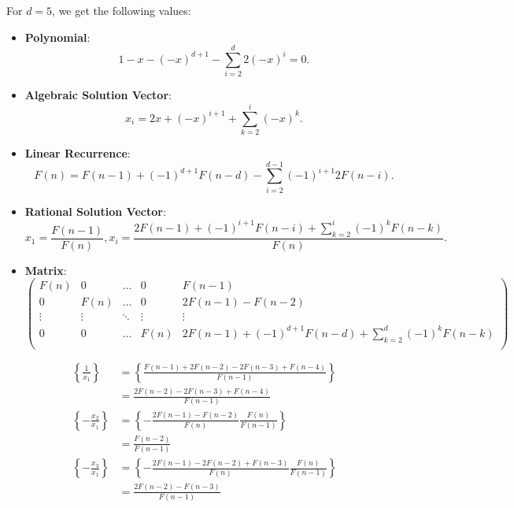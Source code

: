 \documentclass[english,version-2020-11]{uzl-thesis}
\begin{document}
\begin{example}
  For $d = 5$, we get the following values:

\end{example}

\begin{itemize}
  \item \textbf{Polynomial}:
    \[
      1 - x - (-x)^{d+1} - \sum_{i = 2}^{d} 2 (-x)^{i} = 0.
    \]
  \item \textbf{Algebraic Solution Vector}:
    \[
      x_i = 2x + (-x)^{i+1} + \sum_{k=2}^{i} (-x)^{k}.
    \]
  \item \textbf{Linear Recurrence}:
    \[
      F(n) = F(n - 1) + (-1)^{d+1} F(n - d) - \sum_{i=2}^{d - 1} (-1)^{i+1} 2 F(n - i).
    \]
  \item \textbf{Rational Solution Vector}:
    \[
      x_1 = \frac{F(n - 1)}{F(n)}, x_i = \frac{2 F(n-1) + (-1)^{i+1} F(n - i) + \sum_{k=2}^i (-1)^k F(n-k)}{F(n)}.
    \]
  \item \textbf{Matrix}:
    \[\left(\begin{array}{cccc|c}
      F(n)   & 0      & \dots  & 0      & F(n - 1) \\
        0    & F(n)   & \dots  & 0      & 2 F(n - 1) - F(n - 2) \\
      \vdots & \vdots & \ddots & \vdots & \vdots   \\
        0    & 0      & \dots  & F(n)   & 2 F(n-1) + (-1)^{d+1} F(n - d) + \sum_{k=2}^d (-1)^k F(n-k) \\
    \end{array}\right)\]
\end{itemize}

\begin{example}
  \begin{align*}
    \left\{ \frac{1}{x_1} \right\}
    & = \left\{ \frac{F(n - 1) + 2 F(n - 2) - 2 F(n - 3) + F(n - 4)}{F(n - 1)} \right\} \\
    & = \frac{2 F(n - 2) - 2 F(n - 3) + F(n - 4)}{F(n - 1)} \\
    \left\{ -\frac{x_2}{x_1} \right\}
    & = \left\{ -\frac{2 F(n - 1) - F(n - 2)}{F(n)} \frac{F(n)}{F(n - 1)} \right\} \\
    & = \frac{F(n - 2)}{F(n - 1)} \\
    \left\{ -\frac{x_3}{x_1} \right\}
    & = \left\{ -\frac{2 F(n - 1) - 2 F(n - 2) + F(n - 3)}{F(n)} \frac{F(n)}{F(n - 1)} \right\} \\
    & = \frac{2 F(n - 2) - F(n - 3)}{F(n - 1)}
  \end{align*}
\end{example}
\end{document}

